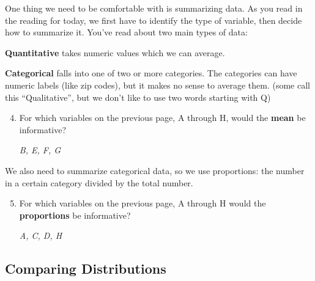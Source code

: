 \label{summry}One thing we need to be comfortable with is
  summarizing data.  As you read in the reading for today, we first
  have to identify the type of variable, then decide how to summarize it.
You've read about two main types of data:
\begin{list}{}{}
\item [\bf Quantitative] takes numeric values which we can average.
\item [\bf Categorical] falls into one of two or more categories.  The
  categories can have numeric labels (like zip codes), but it makes no
  sense to average them. (some call this ``Qualitative'', but we don't
  like to use two words starting with Q) 
\end{list}

\begin{enumerate} 
\setcounter{enumi}{3}
\item  For which variables on the previous page, A through H, would the
  {\bf mean} be informative?
\begin{students}
    \vspace{\fill}    
\end{students}

\begin{key}
  {\it B, E, F, G }
\end{key}
\end{enumerate}

   We also need to summarize categorical data, so we use proportions:
   the number in a certain category divided by the total number.

\begin{enumerate} 
\setcounter{enumi}{4}
\item  For which variables on the previous page, A through H would the
  {\bf proportions} be informative?
\begin{students}
    \vspace*{\fill}    
\end{students}

\begin{key}
  {\it A, C, D, H }
\end{key}
     
\end{enumerate}
\subsection {Comparing Distributions} %



